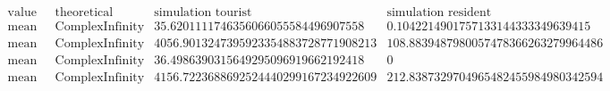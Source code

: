 \[\begin{array}{cccc}
 \text{value} & \text{theoretical} & \text{simulation tourist} & \text{simulation resident} \\
 \text{mean queue size} & \text{ComplexInfinity} & 35.6201111746356066055584496907558 & 0.1042214901757133144333349639415 \\
 \text{mean queue time} & \text{ComplexInfinity} & 4056.9013247395923354883728771908213 & 108.8839487980057478366263279964486 \\
 \text{mean system size} & \text{ComplexInfinity} & 36.4986390315649295096919662192418 & 0 \\
 \text{mean system time} & \text{ComplexInfinity} & 4156.7223688692524440299167234922609 & 212.8387329704965482455984980342594 \\
\end{array}\]

